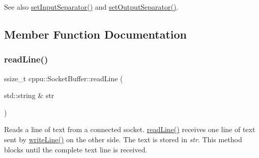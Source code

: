 \begin{DoxySeeAlso}{See also}
\mbox{\hyperlink{classcppu_1_1_socket_buffer_acadf4540c1e3eba67b014753b84b482c}{set\+Input\+Separator()}} and \mbox{\hyperlink{classcppu_1_1_socket_buffer_a0e5e6a9ce3bda28b65c559c8b3c91b0f}{set\+Output\+Separator()}}. 
\end{DoxySeeAlso}


\subsection{Member Function Documentation}
\mbox{\label{classcppu_1_1_socket_buffer_a222769d3776b9cbd3a727ee1f0e60358}} 
\subsubsection{\texorpdfstring{readLine()}{readLine()}}
{\footnotesize\ttfamily ssize\+\_\+t cppu\+::\+Socket\+Buffer\+::read\+Line (\begin{DoxyParamCaption}\item[{std\+::string \&}]{str }\end{DoxyParamCaption})\hspace{0.3cm}{\ttfamily [virtual]}}



Reads a line of text from a connected socket. \mbox{\hyperlink{classcppu_1_1_socket_buffer_a222769d3776b9cbd3a727ee1f0e60358}{read\+Line()}} receives one line of text sent by \mbox{\hyperlink{classcppu_1_1_socket_buffer_a92ae0351aaee8719d34e8c4618495d59}{write\+Line()}} on the other side. The text is stored in {\itshape str}. This method blocks until the complete text line is received. 

